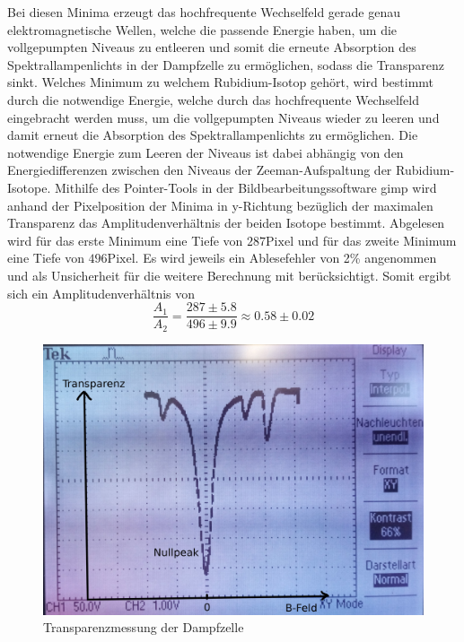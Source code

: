 Bei diesen Minima erzeugt das hochfrequente Wechselfeld gerade genau elektromagnetische Wellen, welche die passende Energie haben, um die vollgepumpten Niveaus zu entleeren und somit die erneute Absorption des Spektrallampenlichts in der Dampfzelle zu ermöglichen, sodass die Transparenz sinkt.
Welches Minimum zu welchem Rubidium-Isotop gehört, wird bestimmt durch die notwendige Energie, welche durch das hochfrequente Wechselfeld eingebracht werden muss, um die vollgepumpten Niveaus wieder zu leeren und damit erneut die Absorption des Spektrallampenlichts zu ermöglichen.
Die notwendige Energie zum Leeren der Niveaus ist dabei abhängig von den Energiedifferenzen zwischen den Niveaus der Zeeman-Aufspaltung der Rubidium-Isotope.
Mithilfe des Pointer-Tools in der Bildbearbeitungssoftware gimp wird anhand der Pixelposition der Minima in y-Richtung bezüglich der maximalen Transparenz das Amplitudenverhältnis der beiden Isotope bestimmt.
Abgelesen wird für das erste Minimum eine Tiefe von $287 \mathrm{Pixel}$ und für das zweite Minimum eine Tiefe von $496 \mathrm{Pixel}$. Es wird jeweils ein Ablesefehler von 2\% angenommen und als Unsicherheit für die weitere Berechnung mit berücksichtigt.
Somit ergibt sich ein Amplitudenverhältnis von
\begin{equation}
  \frac{A_1}{A_2}=\frac{287 \pm5.8}{496 \pm 9.9}\approx 0.58\pm 0.02
 \end{equation}
\begin{figure}
  \centering
  \includegraphics[width=0.9\columnwidth]{pictures/oszilloskop.jpg}
  \caption{Transparenzmessung der Dampfzelle}
  \label{fig:oszi}
\end{figure}
